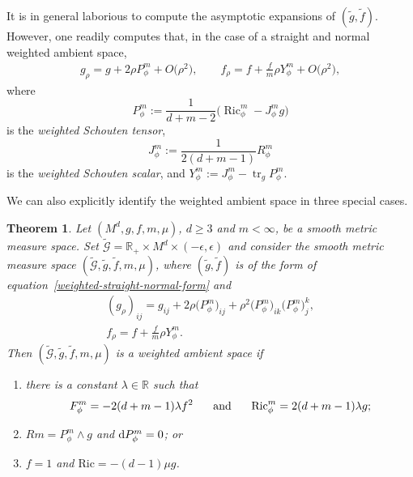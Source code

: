 \documentclass[10pt,a4paper]{amsart}
\DeclareMathOperator{\tr}{tr}
\DeclareMathOperator{\Ric}{Ric}
\numberwithin{equation}{section}
\newtheorem{Theorem}{Theorem}[section]
\begin{document}
It is in general laborious to compute the asymptotic expansions of $(\widetilde{g},\widetilde{f})$.
However, one readily computes that, in the case of a straight and normal weighted ambient space,
\begin{gather*}
 g_\rho = g + 2\rho P_\phi^m+O\big(\rho^2\big), \qquad
 f_\rho = f + \frac{f}{m}\rho Y_\phi^m +O\big(\rho^2\big),
\end{gather*}
where
\begin{equation*}
 P_\phi^m := \frac{1}{d+m-2}\bigl( \Ric_\phi^m - J_\phi^m g\bigr)
\end{equation*}
is the \emph{weighted Schouten tensor},
\begin{equation*}
 J_\phi^m := \frac{1}{2(d+m-1)}R_\phi^m
\end{equation*}
is the \emph{weighted Schouten scalar}, and $Y_\phi^m := J_\phi^m - \tr_g P_\phi^m$.

We can also explicitly identify the weighted ambient space in three special cases.

\begin{Theorem}
 \label{examples-theorem}
Let $(M^d,g,f,m,\mu)$, $d\geq 3$ and $m<\infty$, be a smooth metric measure space. Set $\widetilde{\mathcal{G}}=\mathbb{R}_+\times M^d\times (-\epsilon,\epsilon)$ and consider the smooth metric measure space $(\widetilde{\mathcal{G}},\widetilde{g},\widetilde{f},m,\mu)$, where $(\widetilde{g},\widetilde{f})$ is of the form of equation~\eqref{weighted-straight-normal-form} and
\begin{gather*}
(g_{\rho})_{i j}=g_{i j}+2\rho\big(P_{\phi}^{m}\big)_{i j} +\rho^{2}\big(P_{\phi}^{m}\big)_{i k}\big(P_{\phi}^{m}\big)_{j}^{k},
\\
f_{\rho}=f+ \frac{f}{m}\rho Y_{\phi}^{m}.
\end{gather*}
Then $(\widetilde{\mathcal{G}},\widetilde{g},\widetilde{f},m,\mu)$ is a weighted ambient space if
\begin{enumerate}[label=$(\roman*)$]\itemsep=0pt
\item \label{Theorem 1.2-1} there is a constant $\lambda\in\mathbb{R}$ such that
\[
F_{\phi}^{m}=- 2(d+m-1)\lambda f^{2}\hspace{5mm} \text { and }\hspace{5mm} \mathrm{Ric}_{\phi}^{m}= 2(d+m-1)\lambda g;
\]

\item \label{Theorem 1.2-2} $Rm=P_\phi^m\wedge g$ and ${\rm d}P_\phi^m=0$; or

\item \label{Theorem 1.2-3} $f=1$ and $\mathrm{Ric}=-(d-1)\mu g$.
\end{enumerate}
\end{Theorem}
\end{document}
